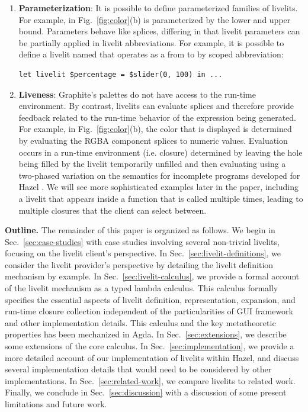 \begin{enumerate}
  \item \textbf{Parameterization}: It is possible to define parameterized families of livelits.
  For example,  in Fig.~\ref{fig:color}(b) is parameterized by the lower and upper bound.
  Parameters behave like splices, differing in that livelit parameters can be partially applied in
  livelit abbreviations. For example, it is possible to define a livelit named 
  that operates as a  from  to  by scoped abbreviation:
  \begin{lstlisting}[numbers=none]
  let livelit $percentage = $slider(0, 100) in ...
  \end{lstlisting}

  \item \textbf{Liveness}: Graphite's palettes do not have
  access to the run-time environment. By contrast, livelits can evaluate splices
  and therefore provide feedback related to the run-time behavior of the expression being generated.
  For example, in Fig.~\ref{fig:color}(b), the color that is displayed is determined by evaluating the RGBA
  component splices to numeric values.
  Evaluation occurs in a run-time environment (i.e. closure) determined by
  leaving the hole being filled by the livelit temporarily unfilled and then evaluating
  using a two-phased variation on the semantics for incomplete programs developed for Hazel \cite{HazelnutLive}.
  We will see more sophisticated examples later in the paper, including a livelit
  that appears inside a function that is called multiple times, leading to multiple closures that the client can
   select between.
\end{enumerate}

\noindent
\textbf{Outline.} The remainder of this paper is organized as follows. We begin in Sec.~\ref{sec:case-studies} with case studies
involving several non-trivial livelits, focusing on the livelit client's perspective.
In Sec.~\ref{sec:livelit-definitions}, we consider the livelit provider's perspective by detailing the livelit
definition mechanism by example.
In Sec.~\ref{sec:livelit-calculus}, we provide a formal account of the livelit mechanism as a typed lambda calculus.
This calculus formally specifies the essential aspects of livelit definition, representation, expansion,
and run-time closure collection independent of the particularities of GUI framework and other implementation details.
This calculus and the key metatheoretic properties has been mechanized in Agda.
In Sec.~\ref{sec:extensions}, we describe some extensions of the core calculus.
In Sec.~\ref{sec:implementation}, we provide a more detailed account of our implementation of livelits within Hazel,
and discuss several implementation details that would need to be considered by other implementations.
In Sec.~\ref{sec:related-work}, we compare livelits to related work.
Finally, we conclude in Sec.~\ref{sec:discussion} with a discussion of some present limitations and future work.